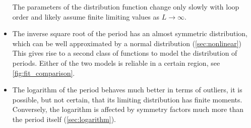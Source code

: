 \documentclass[12pt,a4paper]{article}
\renewcommand{\|}{\rule[-0.4ex]{0.2ex}{1.2em}}
\begin{document}
\begin{itemize}
	 The parameters of the distribution function change  only slowly with loop order and likely assume finite limiting values as $L\rightarrow \infty$. 
	  \item The inverse square root of the period has an almost symmetric distribution, which can be well approximated by a normal distribution (\cref{sec:nonlinear}) This gives rise to a second class of functions to model the distribution of periods. Either of the two models is reliable in a certain region, see \cref{fig:fit_comparison}.
	 \item The logarithm of the period behaves much better in terms of outliers, it is possible, but not certain, that its limiting distribution has finite moments. Conversely, the logarithm is affected by symmetry factors much more than the  period itself (\cref{sec:logarithm}).
\end{itemize}
	
\end{document}

